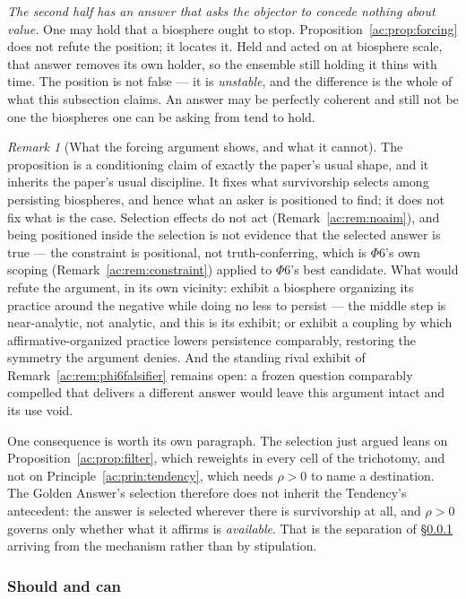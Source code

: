 \documentclass[11pt]{article}
\numberwithin{equation}{section}
\theoremstyle{plain}
\theoremstyle{definition}
\theoremstyle{remark}
\newtheorem{remark}[theorem]{Remark}
\begin{document}
\emph{The second half has an answer that asks the objector to concede
nothing about value.} One may hold that a biosphere ought to stop.
Proposition~\ref{ac:prop:forcing} does not refute the position; it
locates it. Held and acted on at biosphere scale, that answer removes its
own holder, so the ensemble still holding it thins with time. The
position is not false --- it is \emph{unstable}, and the difference is
the whole of what this subsection claims. An answer may be perfectly
coherent and still not be one the biospheres one can be asking from tend
to hold.

\begin{remark}[What the forcing argument shows, and what it cannot]\label{ac:rem:forcing}
The proposition is a conditioning claim of exactly the paper's usual shape, and it inherits the paper's usual discipline. It fixes what survivorship selects among persisting biospheres, and hence what an asker is positioned to find; it does not fix what is the case. Selection effects do not act (Remark~\ref{ac:rem:noaim}), and being positioned inside the selection is not evidence that the selected answer is true --- the constraint is positional, not truth-conferring, which is $\Phi6$'s own scoping (Remark~\ref{ac:rem:constraint}) applied to $\Phi6$'s best candidate. What would refute the argument, in its own vicinity: exhibit a biosphere organizing its practice around the negative while doing no less to persist --- the middle step is near-analytic, not analytic, and this is its exhibit; or exhibit a coupling by which affirmative-organized practice lowers persistence comparably, restoring the symmetry the argument denies. And the standing rival exhibit of Remark~\ref{ac:rem:phi6falsifier} remains open: a frozen question comparably compelled that delivers a different answer would leave this argument intact and its use void.
\end{remark}

One consequence is worth its own paragraph. The selection just argued leans on Proposition~\ref{ac:prop:filter}, which reweights in every cell of the trichotomy, and not on Principle~\ref{ac:prin:tendency}, which needs $\rho > 0$ to name a destination. The Golden Answer's selection therefore does not inherit the Tendency's antecedent: the answer is selected wherever there is survivorship at all, and $\rho > 0$ governs only whether what it affirms is \emph{available}. That is the separation of \S\ref{ac:ssub:shouldcan} arriving from the mechanism rather than by stipulation.

\subsubsection{Should and can}\label{ac:ssub:shouldcan}
\end{document}
